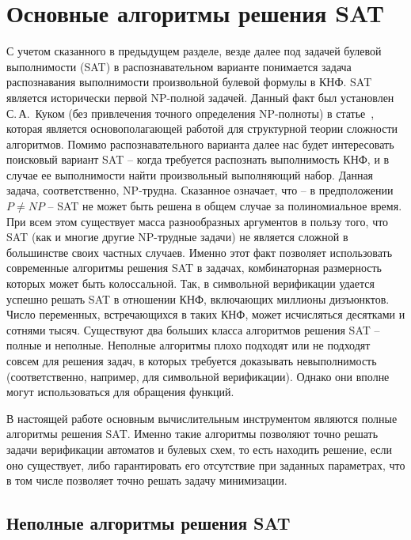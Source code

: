 \section{Основные алгоритмы решения SAT}

С учетом сказанного в предыдущем разделе, везде далее под задачей булевой выполнимости (SAT) в распознавательном варианте понимается задача распознавания выполнимости произвольной булевой формулы в КНФ.
SAT является исторически первой NP-полной задачей.
Данный факт был установлен С.\,А.~Куком (без привлечения точного определения NP-полноты) в статье~\cite{cook}, которая является основополагающей работой для структурной теории сложности алгоритмов.
Помимо распознавательного варианта далее нас будет интересовать поисковый вариант SAT \--- когда требуется распознать выполнимость КНФ, и в случае ее выполнимости найти произвольный выполняющий набор.
Данная задача, соответственно, NP-трудна.
Сказанное означает, что \--- в предположении $P \neq NP$ \--- SAT не может быть решена в общем случае за полиномиальное время.
При всем этом существует масса разнообразных аргументов в пользу того, что SAT (как и многие другие NP-трудные задачи) не является сложной в большинстве своих частных случаев.
Именно этот факт позволяет использовать современные алгоритмы решения SAT в задачах, комбинаторная размерность которых может быть колоссальной.
Так, в символьной верификации удается успешно решать SAT в отношении КНФ, включающих миллионы дизъюнктов.
Число переменных, встречающихся в таких КНФ, может исчисляться десятками и сотнями тысяч.
Существуют два больших класса алгоритмов решения SAT \--- полные и неполные.
Неполные алгоритмы плохо подходят или не подходят совсем для решения задач, в которых требуется доказывать невыполнимость (соответственно, например, для символьной верификации).
Однако они вполне могут использоваться для обращения функций.

В настоящей работе основным вычислительным инструментом являются полные алгоритмы решения SAT.
Именно такие алгоритмы позволяют точно решать задачи верификации автоматов и булевых схем, то есть находить решение, если оно существует, либо гарантировать его отсутствие при заданных параметрах, что в том числе позволяет точно решать задачу минимизации.


\subsection{Неполные алгоритмы решения SAT}

